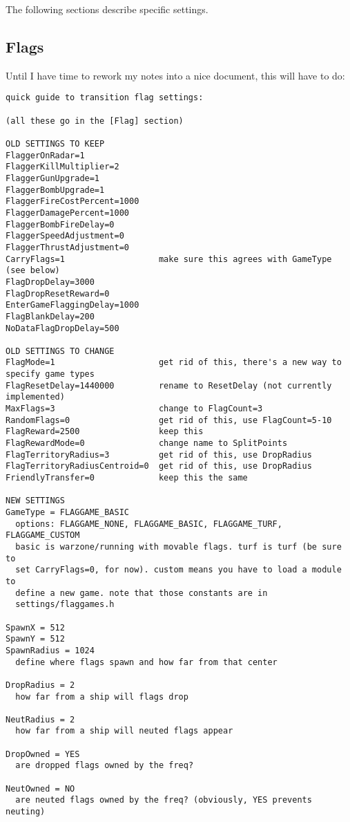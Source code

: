 \documentclass{article}
\begin{document}
The following sections describe specific settings.

\subsection{Flags}

Until I have time to rework my notes into a nice document, this will
have to do:

\begin{verbatim}
quick guide to transition flag settings:

(all these go in the [Flag] section)

OLD SETTINGS TO KEEP
FlaggerOnRadar=1
FlaggerKillMultiplier=2
FlaggerGunUpgrade=1
FlaggerBombUpgrade=1
FlaggerFireCostPercent=1000
FlaggerDamagePercent=1000
FlaggerBombFireDelay=0
FlaggerSpeedAdjustment=0
FlaggerThrustAdjustment=0
CarryFlags=1                   make sure this agrees with GameType (see below)
FlagDropDelay=3000
FlagDropResetReward=0
EnterGameFlaggingDelay=1000
FlagBlankDelay=200
NoDataFlagDropDelay=500

OLD SETTINGS TO CHANGE
FlagMode=1                     get rid of this, there's a new way to specify game types
FlagResetDelay=1440000         rename to ResetDelay (not currently implemented)
MaxFlags=3                     change to FlagCount=3
RandomFlags=0                  get rid of this, use FlagCount=5-10
FlagReward=2500                keep this
FlagRewardMode=0               change name to SplitPoints
FlagTerritoryRadius=3          get rid of this, use DropRadius
FlagTerritoryRadiusCentroid=0  get rid of this, use DropRadius
FriendlyTransfer=0             keep this the same

NEW SETTINGS
GameType = FLAGGAME_BASIC
  options: FLAGGAME_NONE, FLAGGAME_BASIC, FLAGGAME_TURF, FLAGGAME_CUSTOM
  basic is warzone/running with movable flags. turf is turf (be sure to
  set CarryFlags=0, for now). custom means you have to load a module to
  define a new game. note that those constants are in
  settings/flaggames.h

SpawnX = 512
SpawnY = 512
SpawnRadius = 1024
  define where flags spawn and how far from that center

DropRadius = 2
  how far from a ship will flags drop

NeutRadius = 2
  how far from a ship will neuted flags appear

DropOwned = YES
  are dropped flags owned by the freq?

NeutOwned = NO
  are neuted flags owned by the freq? (obviously, YES prevents neuting)
\end{verbatim}
\end{document}
